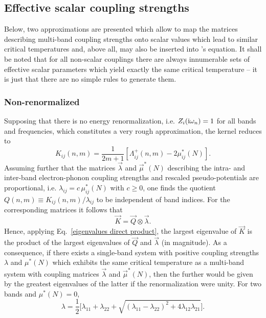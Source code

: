 \subsection{Effective scalar coupling strengths}
\label{effective scalar coupling strengths}

Below, two approximations are presented which allow to map the matrices
describing multi-band coupling strengths onto scalar values which lead to
similar critical temperatures and, above all, may also be inserted into
's equation. It shall be noted that for all non-scalar couplings
there are always innumerable sets of effective scalar parameters which yield
exactly the same critical temperature -- it is just that there are no simple
rules to generate them.

\subsubsection{Non-renormalized}
\label{non-renormalized}

Supposing that there is no energy renormalization, i.e. $Z_i(\mathrm i \omega_n) = 1$
for all bands and frequencies, which constitutes a very rough approximation, the
kernel reduces to
%
\begin{equation*}
   K_{i j}(n, m) = \frac 1 {2 m + 1} [\Lambda_{i j}^+(n, m) - 2 \mu^*_{i j}(N)].
\end{equation*}
%
Assuming further that the matrices $\vec \lambda$ and $\vec \mu^*(N)$ describing
the intra- and inter-band electron-phonon coupling strengths and rescaled
 pseudo-potentials are proportional, i.e. $\lambda_{i j} = c \,
\mu^*_{i j}(N)$ with $c \ge 0$, one finds the quotient $Q(n, m) \equiv K_{i
j}(n, m) / \lambda_{i j}$ to be independent of band indices. For the
corresponding matrices it follows that
%
\begin{equation*}
    \vec K = \vec Q \otimes \vec \lambda.
\end{equation*}
%
Hence, applying Eq.~\ref{eigenvalues direct product}, the largest eigenvalue of
$\vec K$ is the product of the largest eigenvalues of $\vec Q$ and $\vec
\lambda$ (in magnitude). As a consequence, if there exists a single-band system
with positive coupling strengths $\lambda$ and $\mu^*(N)$ which exhibits the
same critical temperature as a multi-band system with coupling matrices $\vec
\lambda$ and $\vec \mu^*(N)$, then the further would be given by the greatest
eigenvalues of the latter if the renormalization were unity. For two bands and
$\mu^*(N) = 0$,
%
\begin{equation*}
    \lambda = \frac 1 2 \Big[ \lambda_{11} + \lambda_{22} + \sqrt{
        (\lambda_{1 1} - \lambda_{2 2})^2 + 4 \lambda_{1 2} \lambda_{2 1}
        } \Big].
\end{equation*}

